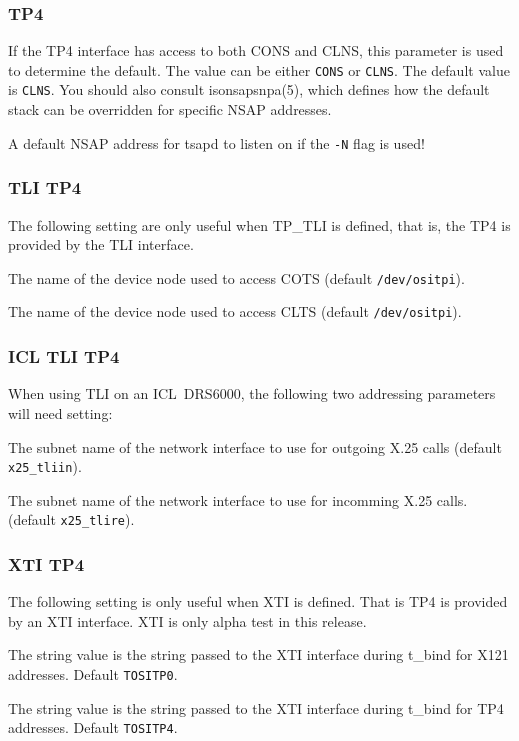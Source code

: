 \subsubsection{TP4}
\begin{describe}
\item[\verb"nsap\_default\_stack"]
	If the TP4 interface has access to both CONS and CLNS, this
	parameter is used to determine the default.  The value can be either
	\verb"CONS" or \verb"CLNS".
	The default value is \verb"CLNS".
	You should also consult \man isonsapsnpa(5), which defines how
	the default stack can be overridden for specific NSAP addresses.
\item[\verb"local\_nsap"]
	A default NSAP address for tsapd to listen on if the \verb"-N"
	flag is used! 
\end{describe}

\subsubsection{TLI TP4}
The following setting are only useful when TP\_TLI is defined, that is,
the TP4 is provided by the TLI interface.

\begin{describe}
\item[\verb"tli\_cots\_dev"]
	The name of the device node used to access COTS
	(default \verb"/dev/ositpi").
\item[\verb"tli\_clts\_dev"]
	The name of the device node used to access CLTS
	(default \verb"/dev/ositpi").
\end{describe}

\subsubsection{ICL TLI TP4}
When using TLI on an ICL~DRS6000, the following two addressing 
parameters will need setting:

\begin{describe}
\item[\verb"tli\_initiator\_prefix"]
	The subnet name of the network interface to use for outgoing X.25 calls
	(default \verb"x25_tliin").
\item[\verb"tli\_responder\_prefix"]
	The subnet name of the network interface to use for incomming
	X.25 calls. 
	(default \verb"x25_tlire").
\end{describe}

\subsubsection{XTI TP4}
The following setting is only useful when XTI is defined.  That is TP4
is provided by an XTI interface.  XTI is only alpha test in this release.
\begin{describe}
\item[\verb"xti\_tp0\_ident"]
	The string value is the string passed to the XTI interface during
	t\_bind for X121 addresses.
	Default \verb"TOSITP0".
\item[\verb"xti\_tp4\_ident"]
	The string value is the string passed to the XTI interface during
	t\_bind for TP4 addresses.
	Default \verb"TOSITP4".
\end{describe}


